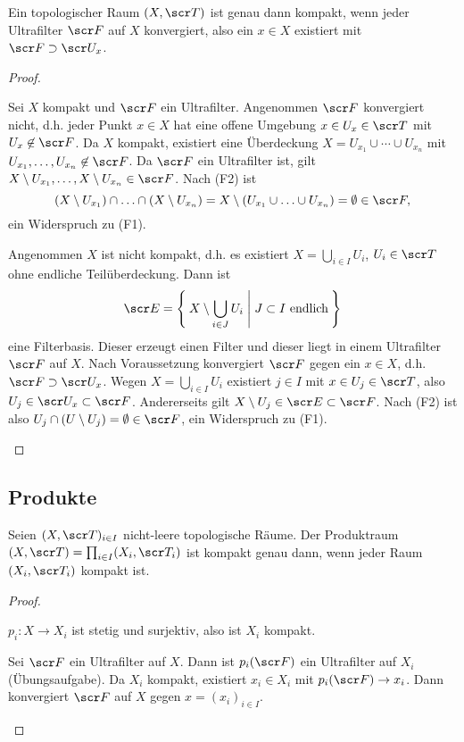 \begin{st}
	Ein topologischer Raum $(X, \scr T)$ ist genau dann kompakt, wenn jeder Ultrafilter $\scr F$ auf $X$ konvergiert, also ein $x \in X$ existiert mit $\scr F \supset \scr U_x$.
	\begin{proof}
		\begin{segnb}[„$\implies$“]
			Sei $X$ kompakt und $\scr F$ ein Ultrafilter.
			Angenommen $\scr F$ konvergiert nicht, d.h. jeder Punkt $x \in X$ hat eine offene Umgebung $x \in U_x \in \scr T$ mit $U_x \not\in \scr F$.
			Da $X$ kompakt, existiert eine Überdeckung $X = U_{x_1} \cup \dotsb \cup U_{x_n}$ mit $U_{x_1}, \dotsc, U_{x_n} \not\in \scr F$.
			Da $\scr F$ ein Ultrafilter ist, gilt $X \setminus U_{x_1}, \dotsc, X \setminus U_{x_n} \in \scr F$.
			Nach (F2) ist
			\[
				(X \setminus U_{x_1}) \cap \dotsc \cap (X \setminus U_{x_n})
				= X \setminus (U_{x_1} \cup \dotsc \cup U_{x_n})
				= \emptyset \in \scr F,
			\]
			ein Widerspruch zu (F1).
		\end{segnb}
		\begin{segnb}[„$\impliedby$“]
			Angenommen $X$ ist nicht kompakt, d.h. es existiert $X = \bigcup_{i\in I} U_i$, $U_i \in \scr T$ ohne endliche Teilüberdeckung.
			Dann ist
			\[
				\scr E
				= \Set{ X \setminus \bigcup_{i\in J} U_i | J \subset I \text{ endlich} }
			\]
			eine Filterbasis.
			Dieser erzeugt einen Filter und dieser liegt in einem Ultrafilter $\scr F$ auf $X$.
			Nach Voraussetzung konvergiert $\scr F$ gegen ein $x \in X$, d.h. $\scr F \supset \scr U_x$.
			Wegen $X = \bigcup_{i\in I} U_i$ existiert $j \in I$ mit $x \in U_j \in \scr T$, also $U_j \in \scr U_x \subset \scr F$.
			Andererseits gilt $X \setminus U_j \in \scr E \subset \scr F$.
			Nach (F2) ist also $U_j \cap (U \setminus U_j) = \emptyset \in \scr F$, ein Widerspruch zu (F1).
		\end{segnb}
	\end{proof}
\end{st}

\subsection{Produkte}

\begin{st}[Tychonoff, 1930]
	Seien $(X, \scr T)_{i\in I}$ nicht-leere topologische Räume.
	Der Produktraum $(X, \scr T) = \prod_{i\in I} (X_i, \scr T_i)$ ist kompakt genau dann, wenn jeder Raum $(X_i, \scr T_i)$ kompakt ist.
	\begin{proof}
		\begin{segnb}[„$\implies$“]
			$p_i: X \to X_i$ ist stetig und surjektiv, also ist $X_i$ kompakt.
		\end{segnb}
		\begin{segnb}[„$\impliedby$“]
			Sei $\scr F$ ein Ultrafilter auf $X$.
			Dann ist $p_i(\scr F)$ ein Ultrafilter auf $X_i$ (Übungsaufgabe). %
			Da $X_i$ kompakt, existiert $x_i \in X_i$ mit $p_i(\scr F) \to x_i$.
			Dann konvergiert $\scr F$ auf $X$ gegen $x = (x_i)_{i\in I}$.
		\end{segnb}
	\end{proof}
\end{st}

